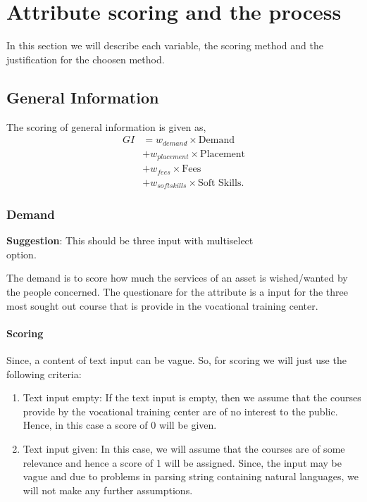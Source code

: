 \documentclass[oneside,twocolumn]{article}
\begin{document}
\section{Attribute scoring and the process}
In this section we will describe each variable, the scoring
method and the justification for the choosen method.

\subsection{General Information}
The scoring of general information is given as,
\begin{align*}
	GI &= w_{demand} \times \text{Demand} \\
	   &+ w_{placement} \times \text{Placement} \\
	   &+ w_{fees} \times \text{Fees} \\
	   &+ w_{soft skills} \times \text{Soft Skills}.
\end{align*}

\subsubsection{Demand}
\textbf{Suggestion}: This should be three input with multiselect \\
option.  

The demand is to score how much the services of an asset is
wished/wanted by the people concerned. The questionare for 
the attribute is a input for the three most sought out course
that is provide in the vocational training center.


\paragraph{Scoring}
Since, a content of text input can be vague. So, for scoring
we will just use the following criteria:
\begin{enumerate}
  \item Text input empty:  
  If the text input is empty, then we assume that the courses
  provide by the vocational training center are of no interest
  to the public. Hence, in this case a score of 0 will be given.

  \item Text input given:
  In this case, we will assume that the courses are of some
  relevance and hence a score of 1 will be assigned. Since, the
  input may be vague and due to problems in parsing string
  containing natural languages, we will not make any further
  assumptions.
  \end{enumerate}
\end{document}
